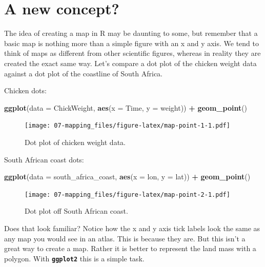 \documentclass[]{book}
\newenvironment{Shaded}{\begin{snugshade}}{\end{snugshade}}
\newcommand{\KeywordTok}[1]{\textcolor[rgb]{0.13,0.29,0.53}{\textbf{#1}}}
\newcommand{\DataTypeTok}[1]{\textcolor[rgb]{0.13,0.29,0.53}{#1}}
\newcommand{\StringTok}[1]{\textcolor[rgb]{0.31,0.60,0.02}{#1}}
\newcommand{\OperatorTok}[1]{\textcolor[rgb]{0.81,0.36,0.00}{\textbf{#1}}}
\newcommand{\NormalTok}[1]{#1}
\theoremstyle{definition}
\theoremstyle{definition}
\theoremstyle{definition}
\theoremstyle{remark}
\begin{document}
\section{A new concept?}\label{a-new-concept}

The idea of creating a map in R may be daunting to some, but remember
that a basic map is nothing more than a simple figure with an x and y
axis. We tend to think of maps as different from other scientific
figures, whereas in reality they are created the exact same way. Let's
compare a dot plot of the chicken weight data against a dot plot of the
coastline of South Africa.

Chicken dots:

\begin{Shaded}
\begin{Highlighting}[]
\KeywordTok{ggplot}\NormalTok{(}\DataTypeTok{data =}\NormalTok{ ChickWeight, }\KeywordTok{aes}\NormalTok{(}\DataTypeTok{x =}\NormalTok{ Time, }\DataTypeTok{y =}\NormalTok{ weight)) }\OperatorTok{+}
\StringTok{  }\KeywordTok{geom_point}\NormalTok{()}
\end{Highlighting}
\end{Shaded}

\begin{figure}
\centering
\texttt{[image: 07-mapping\_files/figure-latex/map-point-1-1.pdf]}
\caption{\label{fig:map-point-1}Dot plot of chicken weight data.}
\end{figure}

South African coast dots:

\begin{Shaded}
\begin{Highlighting}[]
\KeywordTok{ggplot}\NormalTok{(}\DataTypeTok{data =}\NormalTok{ south_africa_coast, }\KeywordTok{aes}\NormalTok{(}\DataTypeTok{x =}\NormalTok{ lon, }\DataTypeTok{y =}\NormalTok{ lat)) }\OperatorTok{+}
\StringTok{  }\KeywordTok{geom_point}\NormalTok{()}
\end{Highlighting}
\end{Shaded}

\begin{figure}
\centering
\texttt{[image: 07-mapping\_files/figure-latex/map-point-2-1.pdf]}
\caption{\label{fig:map-point-2}Dot plot off South African coast.}
\end{figure}

Does that look familiar? Notice how the x and y axis tick labels look
the same as any map you would see in an atlas. This is because they are.
But this isn't a great way to create a map. Rather it is better to
represent the land mass with a polygon. With \textbf{\texttt{ggplot2}}
this is a simple task.
\end{document}

